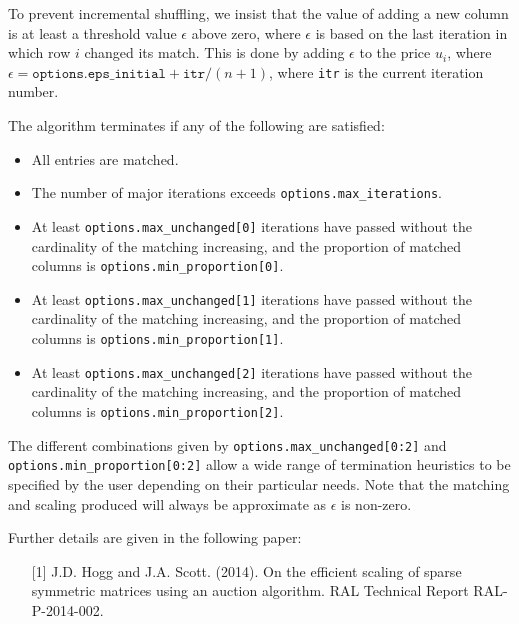 To prevent incremental shuffling, we insist that the value of
adding a new column is at least a threshold value $\epsilon$ above zero, where
$\epsilon$ is based on the last iteration in which row $i$ changed its match.
This is done by adding $\epsilon$ to the price $u_i$, where $\epsilon = \texttt{options.eps\_initial} + \texttt{itr} / (n+1)$, where \texttt{itr} is the current iteration number.

The algorithm terminates if any of the following are satisfied:
\begin{itemize}
   \item All entries are matched.
   \item The number of major iterations exceeds \texttt{options.max\_iterations}.
   \item At least \texttt{options.max\_unchanged[0]} iterations have passed without the cardinality of the matching increasing, and the proportion of matched columns is \texttt{options.min\_proportion[0]}.
   \item At least \texttt{options.max\_unchanged[1]} iterations have passed without the cardinality of the matching increasing, and the proportion of matched columns is \texttt{options.min\_proportion[1]}.
   \item At least \texttt{options.max\_unchanged[2]} iterations have passed without the cardinality of the matching increasing, and the proportion of matched columns is \texttt{options.min\_proportion[2]}.
\end{itemize}

The different combinations given by \texttt{options.max\_unchanged[0:2]}
and
\texttt{options.min\_proportion[0:2]} allow a wide range of termination
heuristics to be specified by the user depending on their particular needs. Note
that the matching and scaling produced will always be approximate as
$\epsilon$ is non-zero.

\vspace{0.2cm}
\noindent
Further details are given in the following paper:
\vspace{-0.2cm}
\begin{itemize}
   \item[{[1]}] J.D. Hogg and J.A. Scott. (2014). On the efficient scaling of sparse symmetric matrices using an auction algorithm. RAL Technical Report RAL-P-2014-002.
\end{itemize}

